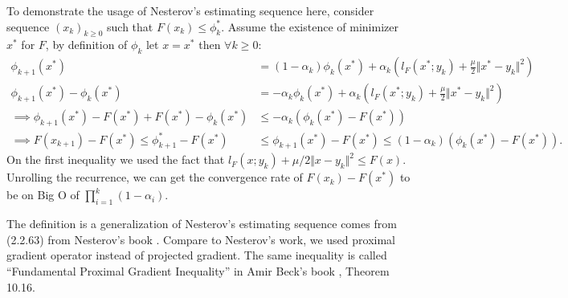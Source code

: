 \documentclass[12pt]{article}
\begin{document}
    To demonstrate the usage of Nesterov's estimating sequence here, consider sequence $(x_k)_{k \ge 0}$ such that $F(x_k) \le \phi_k^*$. 
    Assume the existence of minimizer $x^*$ for $F$, by definition of $\phi_k$ let $x = x^*$ then $\forall k \ge 0$: 
    {\small
    \begin{align*}
        \phi_{k + 1}(x^*)
        &= (1 - \alpha_k)\phi_k (x^*) + 
        \alpha_k 
        \left(
            l_F(x^*; y_k) + \frac{\mu}{2}\Vert x^* - y_k\Vert^2
        \right)
        \\
        \phi_{k + 1}(x^*) - \phi_k(x^*) &= 
        -\alpha_k\phi_k(x^*) 
        +
        \alpha_k
        \left(
            l_F(x^*; y_k) + \frac{\mu}{2}\Vert x^* - y_k\Vert^2
        \right) 
        \\
        \implies
        \phi_{k + 1}(x^*) - F(x^*) + F(x^*) - \phi_k(x^*) 
        &\le -\alpha_k(\phi_k(x^*) - F(x^*))
        \\
        \implies 
        F(x_{k + 1}) - F(x^*)
        \le \phi_{k + 1}^* - F(x^*)
        &\le \phi_{k + 1}(x^*) - F(x^*)
        \le 
        (1 - \alpha_k)(\phi_k(x^*) - F(x^*)). 
    \end{align*}
    }
    On the first inequality we used the fact that $l_F(x; y_k) + \mu/2\Vert x - y_k\Vert^2\le F(x)$. 
    Unrolling the recurrence, we can get the convergence rate of $F(x_k) - F(x^*)$ to be on Big O of $\prod_{i = 1}^k(1 - \alpha_i)$. 
    \begin{remark}
        The definition is a generalization of Nesterov's estimating sequence comes from (2.2.63) from Nesterov's book \cite{nesterov_lectures_2018}. 
        Compare to Nesterov's work, we used proximal gradient operator instead of projected gradient. 
        The same inequality is called ``Fundamental Proximal Gradient Inequality'' in Amir Beck's book \cite{beck_first-order_2017}, Theorem 10.16. 
    \end{remark}
\end{document}
